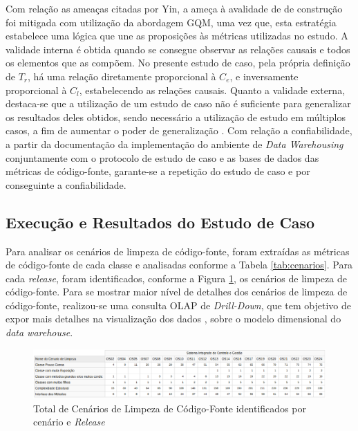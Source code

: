 Com relação as ameaças citadas por Yin, a ameça à avalidade de de construção foi mitigada com utilização da abordagem GQM, uma vez que, esta estratégia estabelece uma lógica que une as proposições às métricas utilizadas no estudo. A validade interna é obtida quando se consegue observar as relações causais e todos os elementos que as compõem. No presente estudo de caso, pela própria definição de $T_r$, há uma relação diretamente proporcional à $C_e$, e inversamente proporcional à $C_l$, estabelecendo as relações causais. Quanto a validade externa, destaca-se que a utilização de um estudo de caso não é suficiente para generalizar os resultados deles obtidos, sendo necessário a utilização de estudo em múltiplos casos, a fim de aumentar o poder de generalização \cite{yin2011applications}. Com relação a confiabilidade, a partir da documentação da implementação do ambiente de \textit{Data Warehousing} conjuntamente com o protocolo de estudo de caso e as bases de dados das métricas de código-fonte, garante-se a repetição do estudo de caso e por conseguinte a confiabilidade.

\subsection{Execução e Resultados do Estudo de Caso}
\label{sec:resultados}
Para analisar os cenários de limpeza de código-fonte, foram extraídas as métricas de código-fonte de cada classe e analisadas conforme a Tabela \ref{tab:cenarios}. Para cada \textit{release}, foram identificados, conforme a Figura \ref{fig:cenarios-release}, os cenários de limpeza de código-fonte. Para se mostrar maior nível de detalhes dos cenários de limpeza de código-fonte, realizou-se uma consulta OLAP de \textit{Drill-Down}, que tem objetivo de expor mais detalhes na visualização dos dados \cite{Kimball2002}, sobre o modelo dimensional do \textit{data warehouse}. 


\begin{figure}[ht!]
\centering
\includegraphics[keepaspectratio=true,scale=0.43]{figuras/total-cenario-tipo.eps}
\caption{Total de Cenários de Limpeza de Código-Fonte identificados por cenário e \textit{Release}}
\label{fig:cenarios-release}
\end{figure}
\FloatBarrier

